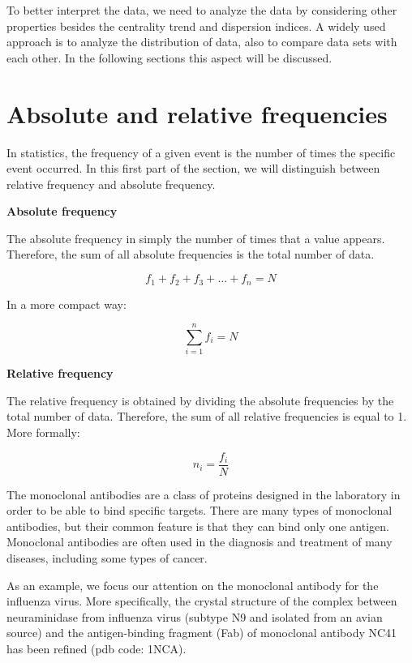 \documentclass[
  letterpaper,
  DIV=11,
  numbers=noendperiod]{scrreprt}
\begin{document}
To better interpret the data, we need to analyze the data by considering
other properties besides the centrality trend and dispersion indices. A
widely used approach is to analyze the distribution of data, also to
compare data sets with each other. In the following sections this aspect
will be discussed.

\hypertarget{absolute-and-relative-frequencies}{%
\section{Absolute and relative
frequencies}\label{absolute-and-relative-frequencies}}

In statistics, the frequency of a given event is the number of times the
specific event occurred. In this first part of the section, we will
distinguish between relative frequency and absolute frequency.

\textbf{Absolute frequency}

The absolute frequency in simply the number of times that a value
appears. Therefore, the sum of all absolute frequencies is the total
number of data.

\[
f_{1} + f_{2} + f_{3} + … + f_{n} = N
\]

In a more compact way:

\[
\sum_{i=1}^n f_i = N
\]

\textbf{Relative frequency}

The relative frequency is obtained by dividing the absolute frequencies
by the total number of data. Therefore, the sum of all relative
frequencies is equal to 1. More formally:

\[
n_i = \frac{f_i}{N}
\]

\begin{tcolorbox}[enhanced jigsaw, arc=.35mm, breakable, toptitle=1mm, opacityback=0, bottomrule=.15mm, toprule=.15mm, rightrule=.15mm, titlerule=0mm, opacitybacktitle=0.6, coltitle=black, left=2mm, title=\textcolor{quarto-callout-tip-color}{\faLightbulb}\hspace{0.5em}{Biological focus: Monoclonal antibody}, bottomtitle=1mm, leftrule=.75mm, colback=white, colbacktitle=quarto-callout-tip-color!10!white, colframe=quarto-callout-tip-color-frame]

The monoclonal antibodies are a class of proteins designed in the
laboratory in order to be able to bind specific targets. There are many
types of monoclonal antibodies, but their common feature is that they
can bind only one antigen. Monoclonal antibodies are often used in the
diagnosis and treatment of many diseases, including some types of
cancer.

As an example, we focus our attention on the monoclonal antibody for the
influenza virus. More specifically, the crystal structure of the complex
between neuraminidase from influenza virus (subtype N9 and isolated from
an avian source) and the antigen-binding fragment (Fab) of monoclonal
antibody NC41 has been refined (pdb code: 1NCA).

\end{tcolorbox}
\end{document}

